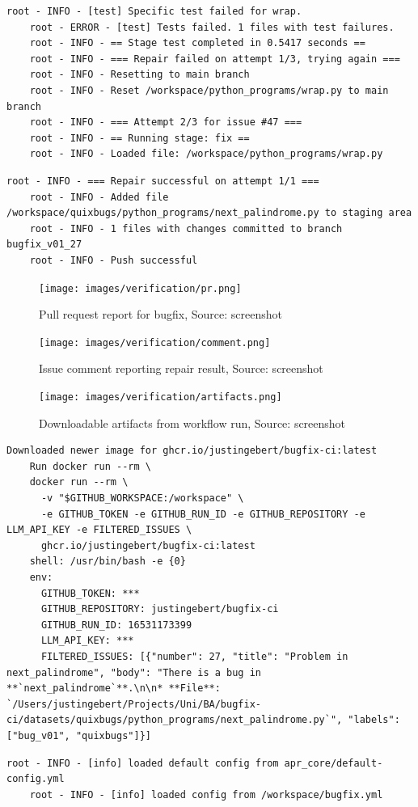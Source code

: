 \begin{lstlisting}[style=log, caption={Iterative patch generation log excerpt}, label={fig:retry}]
    root - INFO - [test] Specific test failed for wrap.
    root - ERROR - [test] Tests failed. 1 files with test failures.
    root - INFO - == Stage test completed in 0.5417 seconds ==
    root - INFO - === Repair failed on attempt 1/3, trying again ===
    root - INFO - Resetting to main branch
    root - INFO - Reset /workspace/python_programs/wrap.py to main branch
    root - INFO - === Attempt 2/3 for issue #47 ===
    root - INFO - == Running stage: fix ==
    root - INFO - Loaded file: /workspace/python_programs/wrap.py
\end{lstlisting}

\begin{lstlisting}[style=log, caption={Branch and commit created for bugfix}, label={lst:branch-commit}]
    root - INFO - === Repair successful on attempt 1/1 ===
    root - INFO - Added file /workspace/quixbugs/python_programs/next_palindrome.py to staging area
    root - INFO - 1 files with changes committed to branch bugfix_v01_27
    root - INFO - Push successful
\end{lstlisting}


\begin{figure}[H]
    \centering
    \texttt{[image: images/verification/pr.png]}
    \caption{Pull request report for bugfix, Source: screenshot}
    \label{fig:pr-report}
\end{figure}

\begin{figure}[H]
    \centering
    \texttt{[image: images/verification/comment.png]}
    \caption{Issue comment reporting repair result, Source: screenshot}
    \label{fig:comment}
\end{figure}

\begin{figure}[H]
    \centering
    \texttt{[image: images/verification/artifacts.png]}
    \caption{Downloadable artifacts from workflow run, Source: screenshot}
    \label{fig:logs-artifacts}
\end{figure}

\begin{lstlisting}[style=log, caption={Docker container runtime log excerpt}, label={lst:docker-log}]
    Downloaded newer image for ghcr.io/justingebert/bugfix-ci:latest
    Run docker run --rm \
    docker run --rm \
      -v "$GITHUB_WORKSPACE:/workspace" \
      -e GITHUB_TOKEN -e GITHUB_RUN_ID -e GITHUB_REPOSITORY -e LLM_API_KEY -e FILTERED_ISSUES \
      ghcr.io/justingebert/bugfix-ci:latest
    shell: /usr/bin/bash -e {0}
    env:
      GITHUB_TOKEN: ***
      GITHUB_REPOSITORY: justingebert/bugfix-ci
      GITHUB_RUN_ID: 16531173399
      LLM_API_KEY: ***
      FILTERED_ISSUES: [{"number": 27, "title": "Problem in next_palindrome", "body": "There is a bug in **`next_palindrome`**.\n\n* **File**: `/Users/justingebert/Projects/Uni/BA/bugfix-ci/datasets/quixbugs/python_programs/next_palindrome.py`", "labels": ["bug_v01", "quixbugs"]}]
\end{lstlisting}

\begin{lstlisting}[style=log, caption={Load custom configuration}, label={lst:load-config}]
    root - INFO - [info] loaded default config from apr_core/default-config.yml
    root - INFO - [info] loaded config from /workspace/bugfix.yml
\end{lstlisting}